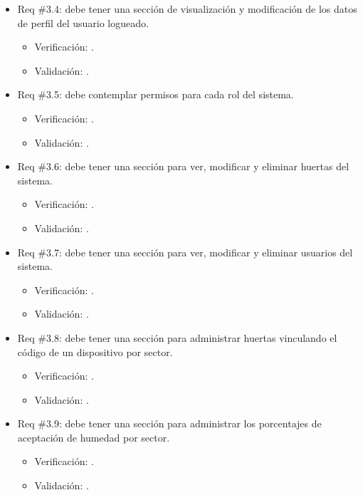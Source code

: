 \documentclass[
11pt, %
codirector, %
]{charter}
\begin{document}
\begin{itemize}
\begin{itemize}
	\item Req \#3.4: debe tener una sección de visualización y modificación de los datos de perfil del usuario logueado.
		\begin{itemize}
		\item Verificación: .
		\item Validación: .\\
		\end{itemize}
		
	\item Req \#3.5: debe contemplar permisos para cada rol del sistema.
		\begin{itemize}
		\item Verificación: .
		\item Validación: .\\
		\end{itemize}
		
	\item Req \#3.6: debe tener una sección para ver, modificar y eliminar huertas del sistema.
		\begin{itemize}
		\item Verificación: .
		\item Validación: .\\
		\end{itemize}
		
	\item Req \#3.7: debe tener una sección para ver, modificar y eliminar usuarios del sistema.
		\begin{itemize}
		\item Verificación: .
		\item Validación: .\\
		\end{itemize}
		
	\item Req \#3.8: debe tener una sección para administrar huertas vinculando el código de un dispositivo por sector.
		\begin{itemize}
		\item Verificación: .
		\item Validación: .\\
		\end{itemize}
		
	\item Req \#3.9: debe tener una sección para administrar los porcentajes de aceptación de humedad por sector.
		\begin{itemize}
		\item Verificación: .
		\item Validación: .\\
		\end{itemize}
		

\end{itemize}
\end{itemize}
\end{document}

